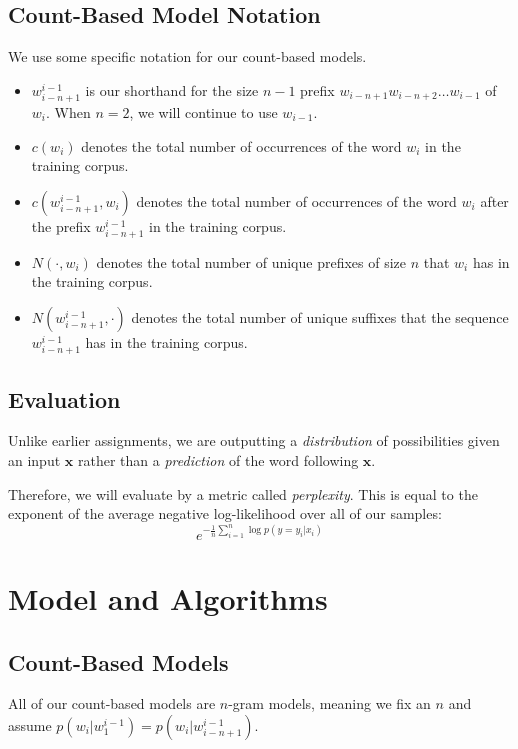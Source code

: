\documentclass[11pt]{article}
\begin{document}
\subsection{Count-Based Model Notation}

We use some specific notation for our count-based models. 
\begin{itemize}
  \item $w^{i-1}_{i-n+1}$ is our shorthand for the size $n-1$ prefix $w_{i-n+1}w_{i-n+2}\dots w_{i-1}$ of $w_i$. When $n = 2$, we will continue to use $w_{i-1}$. 
  \item $c(w_i)$ denotes the total number of occurrences of the word $w_i$ in the training corpus. 
  \item $c(w^{i-1}_{i-n+1}, w_i)$ denotes the total number of occurrences of the word $w_i$ after the prefix $w^{i-1}_{i-n+1}$ in the training corpus. 
  \item $N(\cdot, w_i)$ denotes the total number of unique prefixes of size $n$ that $w_i$ has in the training corpus. 
  \item $N(w^{i-1}_{i-n+1}, \cdot)$ denotes the total number of unique suffixes that the sequence $w^{i-1}_{i-n+1}$ has in the training corpus. 
\end{itemize}

\subsection{Evaluation}

Unlike earlier assignments, we are outputting a \emph{distribution} of possibilities given an input $\mathbf{x}$ rather than a \emph{prediction} of the word following $\mathbf{x}$. 

Therefore, we will evaluate by a metric called \emph{perplexity}. This is equal to the exponent of the average negative log-likelihood over all of our samples:
$$e^{-\frac{1}{n}\sum_{i=1}^n \log p(y = y_i | x_i)}$$

\section{Model and Algorithms}

\subsection{Count-Based Models}

All of our count-based models are $n$-gram models, meaning we fix an $n$ and assume $p(w_i|w^{i-1}_1) = p(w_i|w^{i-1}_{i-n+1})$. 
\end{document}
